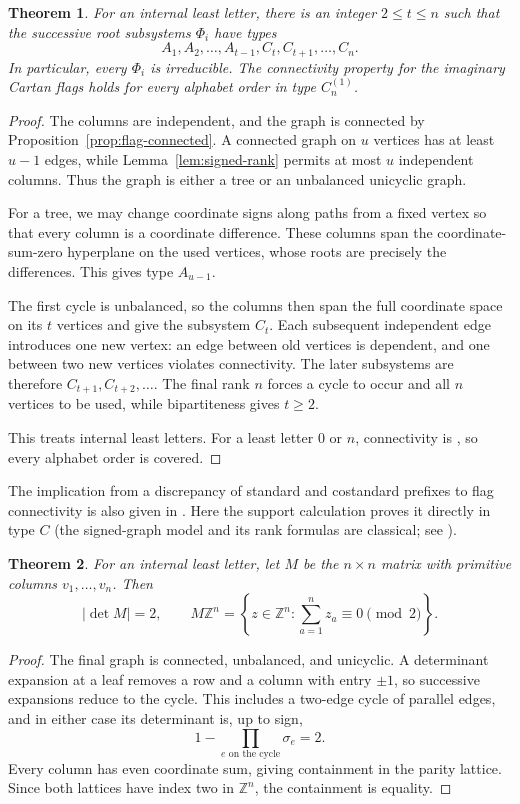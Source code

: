 \documentclass[11pt]{amsart}
\numberwithin{equation}{section}
\newtheorem{theorem}{Theorem}[section]
\theoremstyle{definition}
\newcommand{\Z}{\mathbb Z}
\begin{document}
\begin{theorem}\label{thm:flag-types}
For an internal least letter, there is an integer $2\leq t\leq n$ such that the successive root subsystems $\Phi_i$ have types
\[
 A_1,A_2,\ldots,A_{t-1},C_t,C_{t+1},\ldots,C_n.
\]
In particular, every $\Phi_i$ is irreducible. The connectivity property for the imaginary Cartan flags holds for every alphabet order in type $C_n^{(1)}$.
\end{theorem}
\begin{proof}
The columns are independent, and the graph is connected by Proposition~\ref{prop:flag-connected}. A connected graph on $u$ vertices has at least $u-1$ edges, while Lemma~\ref{lem:signed-rank} permits at most $u$ independent columns. Thus the graph is either a tree or an unbalanced unicyclic graph.

For a tree, we may change coordinate signs along paths from a fixed vertex so that every column is a coordinate difference. These columns span the coordinate-sum-zero hyperplane on the used vertices, whose roots are precisely the differences. This gives type $A_{u-1}$.

The first cycle is unbalanced, so the columns then span the full coordinate space on its $t$ vertices and give the subsystem $C_t$. Each subsequent independent edge introduces one new vertex: an edge between old vertices is dependent, and one between two new vertices violates connectivity. The later subsystems are therefore $C_{t+1},C_{t+2},\ldots$. The final rank $n$ forces a cycle to occur and all $n$ vertices to be used, while bipartiteness gives $t\geq2$.

This treats internal least letters. For a least letter $0$ or $n$, connectivity is \cite[Lemma~4.31]{ETC}, so every alphabet order is covered.
\end{proof}

The implication from a discrepancy of standard and costandard prefixes to flag connectivity is also given in \cite[Proposition~4.28]{ETC}. Here the support calculation proves it directly in type $C$ (the signed-graph model and its rank formulas are classical; see \cite{Zas,ACH}).

\begin{theorem}\label{thm:column-lattice}
For an internal least letter, let $M$ be the $n\times n$ matrix with primitive columns $v_1,\ldots,v_n$. Then
\[
 |\det M|=2,
 \qquad
 M\Z^n=\left\{z\in\Z^n:\sum_{a=1}^n z_a\equiv0\pmod2\right\}.
\]
\end{theorem}
\begin{proof}
The final graph is connected, unbalanced, and unicyclic. A determinant expansion at a leaf removes a row and a column with entry $\pm1$, so successive expansions reduce to the cycle. This includes a two-edge cycle of parallel edges, and in either case its determinant is, up to sign,
\[
 1-\prod_{e\text{ on the cycle}}\sigma_e=2.
\]
Every column has even coordinate sum, giving containment in the parity lattice. Since both lattices have index two in $\Z^n$, the containment is equality.
\end{proof}
\end{document}
